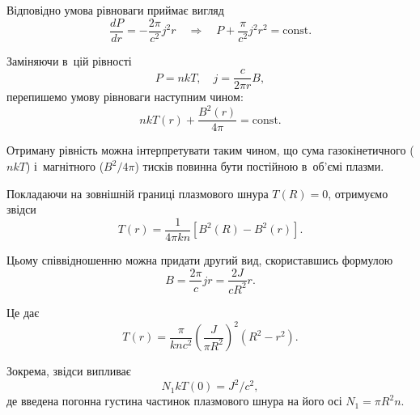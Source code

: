 Відповідно умова рівноваги приймає вигляд
\begin{equation*}
	\frac{dP}{dr} = -\frac{2\pi}{c^2}j^2r \quad\Rightarrow\quad P + \frac{\pi}{c^2}j^2r^2 = \text{const}.
\end{equation*}

Заміняючи в~цій рівності
\begin{equation*}
	P = nkT, \quad j = \frac{c}{2\pi r}B,
\end{equation*}
перепишемо умову рівноваги наступним чином:
\begin{equation*}
	nkT(r) + \frac{B^2(r)}{4\pi} = \text{const}.
\end{equation*}

Отриману рівність можна інтерпретувати таким чином, що сума газокінетичного ($nkT$) і~магнітного ($B^2/4\pi$) тисків повинна бути постійною в~об'ємі плазми.

Покладаючи на зовнішній границі плазмового шнура $T(R) = 0$, отримуємо звідси
\begin{equation*}
	T(r) = \frac{1}{4\pi kn}\left[B^2(R) - B^2(r)\right].
\end{equation*}

Цьому співвідношенню можна придати другий вид, скориставшись формулою
\begin{equation*}
	B = \frac{2\pi}{c}jr = \frac{2J}{cR^2}r.
\end{equation*}

Це дає
\begin{equation*}
	T(r) = \frac{\pi}{knc^2}\left(\frac{J}{\pi R^2}\right)^2(R^2 - r^2).
\end{equation*}

Зокрема, звідси випливає
\begin{equation*}
	N_1 kT(0) = J^2/c^2,
\end{equation*}
де введена погонна густина частинок плазмового шнура на його осі $N_1 = \pi R^2 n$.

